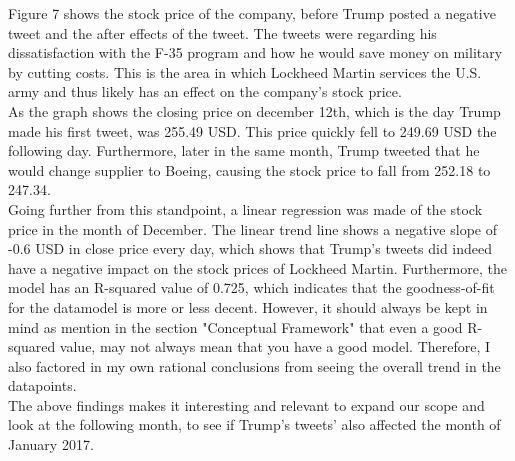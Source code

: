 \documentclass[12pt]{article}
\begin{document}
Figure 7 shows the stock price of the company, before Trump posted a negative tweet and the after effects of the tweet. The tweets were regarding his dissatisfaction with the F-35 program and how he would save money on military by cutting costs. This is the area in which Lockheed Martin services the U.S. army and thus likely has an effect on the company's stock price. \\

As the graph shows the closing price on december 12th, which is the day Trump made his first tweet, was 255.49 USD. This price quickly fell to 249.69 USD the following day. Furthermore, later in the same month, Trump tweeted that he would change supplier to Boeing, causing the stock price to fall from 252.18 to 247.34. \\

Going further from this standpoint,  a linear regression was made of the stock price in the month of December. The linear trend line shows a negative slope of -0.6 USD in close price every day, which shows that Trump's tweets did indeed have a negative impact on the stock prices of Lockheed Martin. Furthermore, the model has an R-squared value of 0.725, which indicates that the goodness-of-fit for the datamodel is more or less decent. However, it should always be kept in mind as mention in the section "Conceptual Framework" that even a good R-squared value, may not always mean that you have a good model. Therefore, I also factored in my own rational conclusions from seeing the overall trend in the datapoints.\\

The above findings makes it interesting and relevant to expand our scope and look at the following month, to see if Trump's tweets' also affected the month of January 2017.
\end{document}
